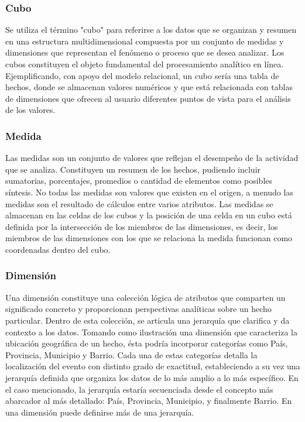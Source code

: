 \subsubsection{Cubo}

Se utiliza el término "cubo" para referirse a los datos que se organizan y resumen en una estructura multidimensional compuesta 
por un conjunto de medidas y dimensiones que representan el fenómeno o proceso que se desea analizar. Los cubos constituyen 
el objeto fundamental del procesamiento analítico en línea\cite{lismaster}. Ejemplificando, con apoyo del modelo relacional, 
un cubo sería una tabla de hechos, donde se almacenan valores numéricos y que est\'a relacionada con tablas de dimensiones 
que ofrecen al usuario diferentes puntos de vista para el análisis de los valores.

\subsubsection{Medida}

Las medidas son un conjunto de valores que reflejan el desempeño de la actividad que se analiza. Constituyen un resumen de los 
hechos\cite{lismaster}, pudiendo incluir sumatorias, porcentajes, promedios o cantidad de elementos como posibles síntesis. 
No todas las medidas son valores que existen en el origen, a menudo las medidas son el resultado de cálculos entre 
varios atributos. Las medidas se almacenan en las celdas de los cubos y la posici\'on de una celda en un cubo est\'a definida por la 
intersecci\'on de los miembros de las dimensiones, es decir, los miembros de las dimensiones con los que se relaciona la medida 
funcionan como coordenadas dentro del cubo.

\subsubsection{Dimensión}

Una dimensión constituye una colección lógica de atributos que comparten un significado concreto y proporcionan 
perspectivas analíticas sobre un hecho particular. Dentro de esta colección, se articula una jerarquía que clarifica y da contexto a los 
datos. Tomando como ilustración una dimensión que caracteriza la ubicación geográfica de un hecho, ésta podría incorporar categorías 
como País, Provincia, Municipio y Barrio. Cada una de estas categorías detalla la localización del evento con distinto grado de 
exactitud, estableciendo a su vez una jerarquía definida que organiza los datos de lo más amplio a lo más específico. En el 
caso mencionado, la jerarquía estaría secuenciada desde el concepto más abarcador al más detallado: País, Provincia, 
Municipio, y finalmente Barrio. En una dimensión puede definirse m\'as de una jerarquía\cite{lismaster}.

